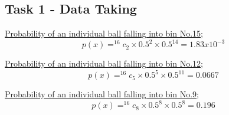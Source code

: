 \documentclass[11pt]{article}
\begin{document}
\subsection{Task 1 - Data Taking}
\label{Task 1 - Data Taking SubSection}

\underline{Probability of an individual ball falling into bin No.15};
\begin{equation} \label{Q1.1}
p(x) = ^{16}c_2 \times 0.5^2 \times 0.5^{14} = 1.83x10^{-3}
\end{equation}

\underline{Probability of an individual ball falling into bin No.12};
\begin{equation} \label{Q1.2}
p(x) = ^{16}c_5 \times 0.5^5 \times 0.5^{11} = 0.0667
\end{equation}

\underline{Probability of an individual ball falling into bin No.9};
\begin{equation} \label{Q1.3}
p(x) = ^{16}c_8 \times 0.5^8 \times 0.5^8 = 0.196
\end{equation}

\bigskip
\end{document}
